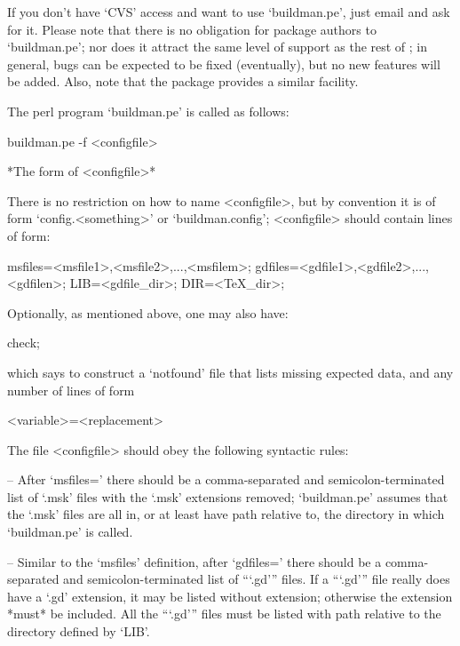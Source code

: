 \enditems

If you don't have `CVS' access and want to use `buildman.pe', just  email
 and ask for it.  Please  note  that
there is no obligation for package authors to `buildman.pe'; nor does  it
attract the same level of support as the rest of {\GAP}; in general, bugs
can be expected to be fixed (eventually), but no  new  features  will  be
added. Also, note that the  package  provides  a  similar
facility.

The perl program `buildman.pe' is called as follows:

buildman.pe -f <configfile>

*The form of <configfile>*

There is no restriction on how to name <configfile>, but by convention it
is of form `config.<something>' or `buildman.config'; <configfile> should
contain lines of form:

msfiles=<msfile1>,<msfile2>,...,<msfilem>;
gdfiles=<gdfile1>,<gdfile2>,...,<gdfilen>;
LIB=<gdfile_dir>;
DIR=<TeX_dir>;

Optionally, as mentioned above, one may also have:

check;

which says to construct a `notfound' file  that  lists  missing  expected
data, and any number of lines of form

<variable>=<replacement>

\goodbreak%
The file <configfile> should obey the following syntactic rules:

\beginlist%

\item{--}
After   `msfiles='   there    should    be    a    comma-separated    and
semicolon-terminated list of `.msk'  files  with  the  `.msk'  extensions
removed; `buildman.pe' assumes that the `.msk' files are all  in,  or  at
least have path relative to, the  directory  in  which  `buildman.pe'  is
called.

\item{--}
Similar to the `msfiles' definition, after `gdfiles=' there should  be  a
comma-separated and semicolon-terminated list of ```.gd'''  files.  If  a
```.gd''' file really does have a  `.gd'  extension,  it  may  be  listed
without extension; otherwise the extension *must* be  included.  All  the
```.gd''' files must be  listed  with  path  relative  to  the  directory
defined by `LIB'.

